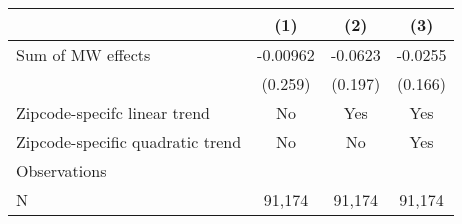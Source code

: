 {
\def\sym#1{\ifmmode^{#1}\else\(^{#1}\)\fi}
\begin{tabular}{l*{3}{c}}
\hline\hline
          &\multicolumn{1}{c}{(1)}         &\multicolumn{1}{c}{(2)}         &\multicolumn{1}{c}{(3)}         \\
\hline
Sum of MW effects& -0.00962         &  -0.0623         &  -0.0255         \\
          &  (0.259)         &  (0.197)         &  (0.166)         \\
\hline
Zipcode-specifc linear trend&       No         &      Yes         &      Yes         \\
Zipcode-specific quadratic trend&       No         &       No         &      Yes         \\
Observations&                  &                  &                  \\
N         &   91,174         &   91,174         &   91,174         \\
\hline\hline
\end{tabular}
}
